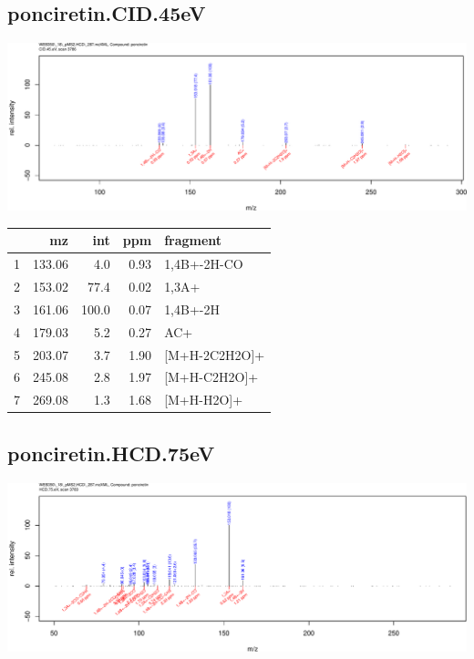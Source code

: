 \documentclass[]{article}
\begin{document}
\clearpage\subsection{ponciretin.CID.45eV}
\includegraphics[width=\textwidth]{WEB350_files/figure-latex/unnamed-chunk-3-34}

\begin{table}[ht]
\centering
\begin{tabular}{rrrrl}
  \toprule
 & mz & int & ppm & fragment \\ 
  \midrule
1 & 133.06 & 4.0 & 0.93 & 1,4B+-2H-CO \\ 
  2 & 153.02 & 77.4 & 0.02 & 1,3A+ \\ 
  3 & 161.06 & 100.0 & 0.07 & 1,4B+-2H \\ 
  4 & 179.03 & 5.2 & 0.27 & AC+ \\ 
  5 & 203.07 & 3.7 & 1.90 & [M+H-2C2H2O]+ \\ 
  6 & 245.08 & 2.8 & 1.97 & [M+H-C2H2O]+ \\ 
  7 & 269.08 & 1.3 & 1.68 & [M+H-H2O]+ \\ 
   \bottomrule
\end{tabular}
\end{table}

\clearpage\subsection{ponciretin.HCD.75eV}
\includegraphics[width=\textwidth]{WEB350_files/figure-latex/unnamed-chunk-3-35}
\end{document}
